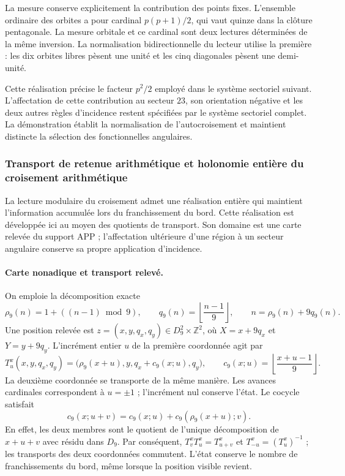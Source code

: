 La mesure conserve explicitement la contribution des points fixes.
L'ensemble ordinaire des orbites a pour cardinal $p(p+1)/2$, qui vaut
quinze dans la clôture pentagonale. La mesure orbitale et ce cardinal sont
deux lectures déterminées de la même inversion. La normalisation
bidirectionnelle du lecteur utilise la première : les dix orbites libres
pèsent une unité et les cinq diagonales pèsent une demi-unité.

Cette réalisation précise le facteur $p^2/2$ employé dans le système
sectoriel suivant. L'affectation de cette contribution au secteur $23$,
son orientation négative et les deux autres règles d'incidence restent
spécifiées par le système sectoriel complet. La démonstration établit la
normalisation de l'autocroisement et maintient distincte la sélection des
fonctionnelles angulaires.




\subsubsection{Transport de retenue arithmétique et holonomie entière du croisement arithmétique}
\label{ii:subsec:transporte-entero-cruce}

La lecture modulaire du croisement admet une réalisation entière qui maintient
l'information accumulée lors du franchissement du bord. Cette
réalisation est développée ici au moyen des quotients de transport. Son domaine est une carte
relevée du support APP ; l'affectation ultérieure d'une région à un secteur
angulaire conserve sa propre application d'incidence.

\paragraph{Carte nonadique et transport relevé.}
On emploie la décomposition exacte
\[
 \rho_9(n)=1+((n-1)\bmod9),\qquad
 q_9(n)=\left\lfloor\frac{n-1}{9}\right\rfloor,
 \qquad n=\rho_9(n)+9q_9(n).
\]
Une position relevée est
$z=(x,y,q_x,q_y)\in D_9^2\times\mathbb Z^2$, où
$X=x+9q_x$ et $Y=y+9q_y$. L'incrément entier $u$ de la première
coordonnée agit par
\[
 T^x_u(x,y,q_x,q_y)=
 \bigl(\rho_9(x+u),y,q_x+c_9(x;u),q_y\bigr),\qquad
 c_9(x;u)=\left\lfloor\frac{x+u-1}{9}\right\rfloor.
\]
La deuxième coordonnée se transporte de la même manière. Les avances
cardinales correspondent à $u=\pm1$ ; l'incrément nul conserve l'état.
Le cocycle satisfait
\[
 c_9(x;u+v)=c_9(x;u)+c_9(\rho_9(x+u);v).
\]
En effet, les deux membres sont le quotient de l'unique décomposition de
$x+u+v$ avec résidu dans $D_9$. Par conséquent,
$T^x_vT^x_u=T^x_{u+v}$ et $T^x_{-u}=(T^x_u)^{-1}$ ; les transports
des deux coordonnées commutent. L'état conserve le nombre de franchissements
du bord, même lorsque la position visible revient.


